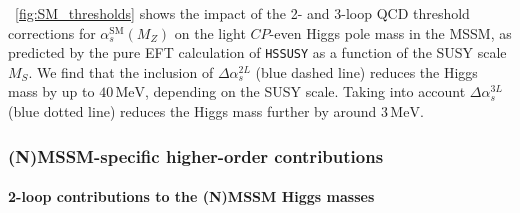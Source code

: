 \documentclass[final,3p,11pt,pdflatex]{elsarticle}
\makeatletter
\newcommand{\modelname}[1]{\texttt{#1}\@\xspace}
\newcommand{\HSSUSY}{\modelname{HSSUSY}}
\newcommand{\unit}[1]{\,\text{#1}}      %
\newcommand{\SM}{\ensuremath{\text{SM}}\xspace}
\newcommand{\MS}{\ensuremath{M_S}\xspace}
\newcommand{\figref}[1]{\figurename~\ref{#1}}
\newcommand{\CP}{\ensuremath{CP}\xspace}
\def\as{\alpha_s}
\makeatother
\begin{document}
\figref{fig:SM_thresholds} shows the impact of the 2- and 3-loop QCD
threshold corrections for $\as^{\SM}(M_Z)$ on the light \CP-even Higgs
pole mass in the MSSM, as predicted by the pure EFT calculation of
\HSSUSY as a function of the SUSY scale \MS.  We find that the
inclusion of $\Delta\as^{2L}$ (blue dashed line) reduces the Higgs
mass by up to $40\unit{MeV}$, depending on the SUSY scale.  Taking
into account $\Delta\as^{3L}$ (blue dotted line) reduces the Higgs
mass further by around $3\unit{MeV}$.

\subsubsection{(N)MSSM-specific higher-order contributions}
\label{sec:MSSM-specific_ho_corrections}
\paragraph{2-loop contributions to the (N)MSSM Higgs masses}
\end{document}
